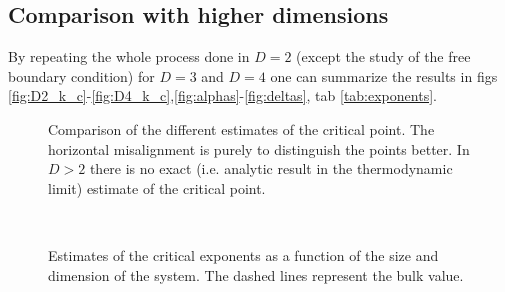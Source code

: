 \documentclass[a4paper, 11pt]{article}
\begin{document}
    \subsection{Comparison with higher dimensions}
      By repeating the whole process done in $D=2$ (except the study of the free boundary condition) for $D = 3$ and $D = 4$ one can summarize the results in figs \ref{fig:D2_k_c}-\ref{fig:D4_k_c},\ref{fig:alphas}-\ref{fig:deltas}, tab \ref{tab:exponents}.

      \begin{figure}
        \centering
        \begin{subfigure}[]{
          \label{fig:D2_k_c}}
        \end{subfigure}
        \begin{subfigure}[]{
          \label{fig:D3_k_c}}
        \end{subfigure}
        \begin{subfigure}[]{
          \label{fig:D4_k_c}}
        \end{subfigure}
        \caption{Comparison of the different estimates of the critical point. The horizontal misalignment is purely to distinguish the points better. In $D > 2$ there is no exact (i.e. analytic result in the thermodynamic limit) estimate of the critical point.}
      \end{figure}

      \begin{figure}
        \centering
        \begin{subfigure}[Solid $\alpha_1$, dotted $\alpha_2$]{
          \label{fig:alphas}}
        \end{subfigure}
        \begin{subfigure}[]{
          \label{fig:betas}}
        \end{subfigure} \\
        \begin{subfigure}[Solid $\gamma_1$, dotted $\gamma_2$]{
          \label{fig:gammas}}
        \end{subfigure}
        \begin{subfigure}[]{
          \label{fig:deltas}}
        \end{subfigure}
        \caption{Estimates of the critical exponents as a function of the size and dimension of the system. The dashed lines represent the bulk value.}
      \end{figure}
\end{document}
